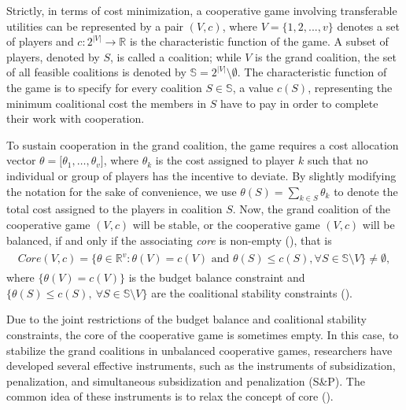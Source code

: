 \documentclass[authoryear,review,12pt]{elsarticle}
\newcommand{\R}{\mathbb{R}}
\begin{document}
Strictly, in terms of cost minimization, a cooperative game involving transferable utilities can be represented by a pair $(V,c)$, where $V = \{1,2,...,v\}$ denotes a set of players and $c:2^{|V|} \rightarrow \mathbb{R}$ is the characteristic function of the game. A subset of players, denoted by $S$, is called a coalition; while $V$ is the grand coalition, the set of all feasible coalitions is denoted by $\mathbb{S} = 2^{|V|} \setminus \emptyset$. The characteristic function of the game is to specify for every coalition $S \in \mathbb{S}$, a value $c(S)$, representing the minimum coalitional cost the members in $S$ have to pay in order to complete their work with cooperation.



To sustain cooperation in the grand coalition, the game requires a cost allocation vector $\theta= \big[\theta_1,\ldots,\theta_v\big]$, where $\theta_k$ is the cost assigned to player $k$ such that no individual or group of players has the incentive to deviate. By slightly modifying the notation for the sake of convenience, we use $\theta(S)=\sum_{k\in S}\theta_k$ to denote the total cost assigned to the players in coalition $S$.
Now, the grand coalition of the cooperative game $(V,c)$ will be stable, or the cooperative game $(V,c)$ will be balanced, if and only if the associating \textit{core} is non-empty (\citealt{bondareva1963some}), that is
\begin{eqnarray}\label{eqn:core}
\begin{aligned}
Core(V,c) = \bigg\{ \theta \in \R^v: \theta(V)=c(V) \mbox{ and } \theta(S) \leq c(S), \forall S \in \mathbb{S} \setminus V \bigg\} \neq \emptyset,
\end{aligned}
\end{eqnarray}
where $\big\{ \theta(V)=c(V) \big\}$ is the budget balance constraint and $\big\{ \theta(S) \leq c(S),~ \forall S \in \mathbb{S} \setminus V \big\}$ are the coalitional stability constraints (\citealt{shapley1969market}).

Due to the joint restrictions of the budget balance and coalitional stability constraints, the core of the cooperative game is sometimes empty.
In this case, to stabilize the grand coalitions in unbalanced cooperative games, researchers have developed several effective instruments, such as the instruments of subsidization, penalization, and simultaneous subsidization and penalization (S\&P).
The common idea of these instruments is to relax the concept of core (\citealt{curiel2013cooperative}).
\end{document}
